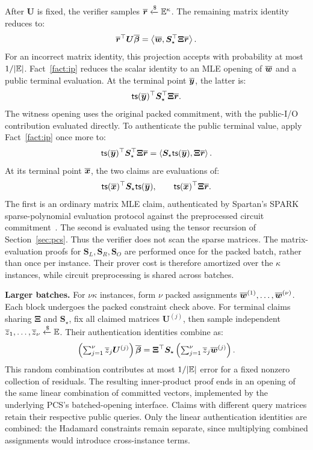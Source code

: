 After \(\bm U\) is fixed, the verifier samples
\(\overline{\bm r}\mathrel{\xleftarrow{\$}}\mathbb{E}^\kappa\).
The remaining matrix identity reduces to:
\[
    \overline{\bm r}^{\top}\bm U\overline{\bm\beta}
       =\left\langle
           \overline{\bm w},
           \bm S_\star^\top\bm\Xi\overline{\bm r}
         \right\rangle.
\]
For an incorrect matrix identity, this projection accepts with
probability at most \(1/|\mathbb{E}|\).
Fact~\ref{fact:ip} reduces the scalar identity to an MLE opening
of \(\overline{\bm w}\) and a public terminal evaluation.
At the terminal point \(\overline{\bm y}\), the latter is:
\[
    {\sf ts}(\overline{\bm y})^\top
       \bm S_\star^\top\bm\Xi\overline{\bm r}.
\]
The witness opening uses the original packed commitment, with
the public-I/O contribution evaluated directly.
To authenticate the public terminal value, apply
Fact~\ref{fact:ip} once more to:
\[
    {\sf ts}(\overline{\bm y})^\top
       \bm S_\star^\top\bm\Xi\overline{\bm r}
    =
    \left\langle
        \bm S_\star{\sf ts}(\overline{\bm y}),
        \bm\Xi\overline{\bm r}
    \right\rangle.
\]
At its terminal point \(\overline{\bm x}\), the two claims are
evaluations of:
\[
    {\sf ts}(\overline{\bm x})^\top
       \bm S_\star{\sf ts}(\overline{\bm y}),
    \qquad
    {\sf ts}(\overline{\bm x})^\top\bm\Xi\overline{\bm r}.
\]
The first is an ordinary matrix MLE claim, authenticated by
Spartan's SPARK sparse-polynomial evaluation protocol against
the preprocessed circuit commitment~\cite{crypto/Setty20}.
The second is evaluated using the tensor recursion of
Section~\ref{sec:pcs}.
Thus the verifier does not scan the sparse matrices.
The matrix-evaluation proofs for
\(\bm S_L,\bm S_R,\bm S_O\) are performed once for the packed
batch, rather than once per instance. Their prover cost is
therefore amortized over the \(\kappa\) instances, while circuit
preprocessing is shared across batches.

\smallskip\noindent\textbf{Larger batches.}
For \(\nu\kappa\) instances, form \(\nu\) packed assignments
\(\overline{\bm w}^{(1)},\ldots,\overline{\bm w}^{(\nu)}\).
Each block undergoes the packed constraint check above.
For terminal claims sharing \(\bm\Xi\) and \(\bm S_\star\),
fix all claimed matrices \(\bm U^{(j)}\), then sample independent
\(\overline{z}_1,\ldots,\overline{z}_\nu\mathrel{\xleftarrow{\$}}\mathbb{E}\).
Their authentication identities combine as:
\[
    \left(\textstyle\sum_{j=1}^{\nu}\overline{z}_j\bm U^{(j)}\right)
       \overline{\bm\beta}
    =
    \bm\Xi^\top\bm S_\star
       \left(\textstyle\sum_{j=1}^{\nu}\overline{z}_j
          \overline{\bm w}^{(j)}\right).
\]
This random combination contributes at most
\(1/|\mathbb{E}|\) error for a fixed nonzero collection
of residuals. The resulting inner-product proof ends in an
opening of the same linear combination of committed vectors,
implemented by the underlying PCS's batched-opening interface.
Claims with different query matrices retain their respective
public queries.
Only the linear authentication identities are combined:
the Hadamard constraints remain separate, since multiplying
combined assignments would introduce cross-instance terms.


